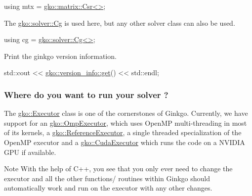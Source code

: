 \begin{DoxyCode}
\textcolor{keyword}{using} mtx = \hyperlink{classgko_1_1matrix_1_1Csr}{gko::matrix::Csr<>};
\end{DoxyCode}


The \hyperlink{classgko_1_1solver_1_1Cg}{gko\+::solver\+::\+Cg} is used here, but any other solver class can also be used.


\begin{DoxyCode}
\textcolor{keyword}{using} cg = \hyperlink{classgko_1_1solver_1_1Cg}{gko::solver::Cg<>};
\end{DoxyCode}


Print the ginkgo version information.


\begin{DoxyCode}
std::cout << \hyperlink{classgko_1_1version__info_a6daeb8a087cfb57fa055526fc133d8eb}{gko::version\_info::get}() << std::endl;
\end{DoxyCode}


\label{_Wheredoyouwanttorunyoursolver}%
 \subsubsection*{Where do you want to run your solver ?}

The \hyperlink{classgko_1_1Executor}{gko\+::\+Executor} class is one of the cornerstones of Ginkgo. Currently, we have support for an \hyperlink{classgko_1_1OmpExecutor}{gko\+::\+Omp\+Executor}, which uses Open\+MP multi-\/threading in most of its kernels, a \hyperlink{classgko_1_1ReferenceExecutor}{gko\+::\+Reference\+Executor}, a single threaded specialization of the Open\+MP executor and a \hyperlink{classgko_1_1CudaExecutor}{gko\+::\+Cuda\+Executor} which runs the code on a N\+V\+I\+D\+IA G\+PU if available. \begin{DoxyNote}{Note}
With the help of C++, you see that you only ever need to change the executor and all the other functions/ routines within Ginkgo should automatically work and run on the executor with any other changes.
\end{DoxyNote}

